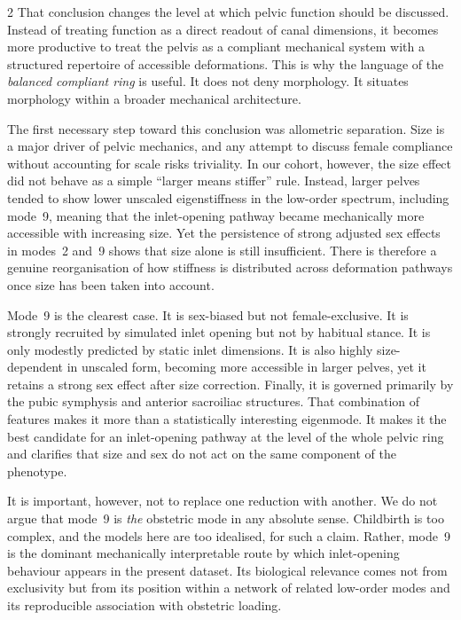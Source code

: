 \documentclass[openacc]{rsproca_new}
\begin{document}
\begin{multicols}{2}
That conclusion changes the level at which pelvic function should be discussed. Instead of treating function as a direct readout of canal dimensions, it becomes more productive to treat the pelvis as a compliant mechanical system with a structured repertoire of accessible deformations. This is why the language of the \emph{balanced compliant ring} is useful. It does not deny morphology. It situates morphology within a broader mechanical architecture.

The first necessary step toward this conclusion was allometric separation. Size is a major driver of pelvic mechanics, and any attempt to discuss female compliance without accounting for scale risks triviality. In our cohort, however, the size effect did not behave as a simple ``larger means stiffer'' rule. Instead, larger pelves tended to show lower unscaled eigenstiffness in the low-order spectrum, including mode~9, meaning that the inlet-opening pathway became mechanically more accessible with increasing size. Yet the persistence of strong adjusted sex effects in modes~2 and~9 shows that size alone is still insufficient. There is therefore a genuine reorganisation of how stiffness is distributed across deformation pathways once size has been taken into account.

Mode~9 is the clearest case. It is sex-biased but not female-exclusive. It is strongly recruited by simulated inlet opening but not by habitual stance. It is only modestly predicted by static inlet dimensions. It is also highly size-dependent in unscaled form, becoming more accessible in larger pelves, yet it retains a strong sex effect after size correction. Finally, it is governed primarily by the pubic symphysis and anterior sacroiliac structures. That combination of features makes it more than a statistically interesting eigenmode. It makes it the best candidate for an inlet-opening pathway at the level of the whole pelvic ring and clarifies that size and sex do not act on the same component of the phenotype.

It is important, however, not to replace one reduction with another. We do not argue that mode~9 is \emph{the} obstetric mode in any absolute sense. Childbirth is too complex, and the models here are too idealised, for such a claim. Rather, mode~9 is the dominant mechanically interpretable route by which inlet-opening behaviour appears in the present dataset. Its biological relevance comes not from exclusivity but from its position within a network of related low-order modes and its reproducible association with obstetric loading.


\end{multicols}
\end{document}
